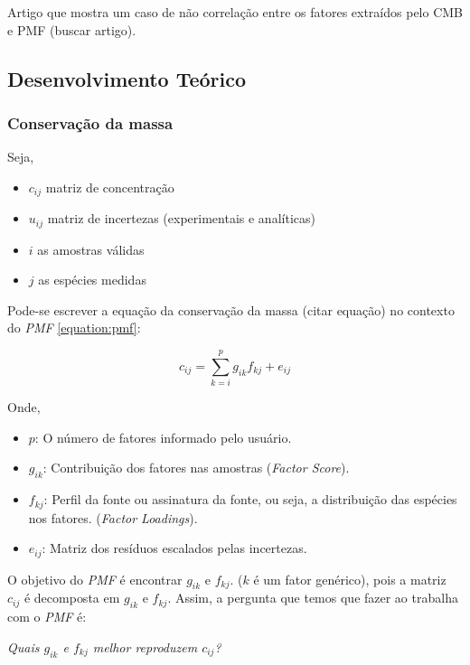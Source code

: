 Artigo que mostra um caso de não correlação entre os fatores extraídos pelo 
CMB e PMF (buscar artigo).

\subsection{Desenvolvimento Teórico} 

\subsubsection{Conservação da massa}

Seja,

\begin{itemize}
  \item $c_{ij}$ matriz de concentração
  \item $u_{ij}$ matriz de incertezas (experimentais e analíticas)
  \item $i$ as amostras válidas
  \item $j$ as espécies medidas
\end{itemize}

Pode-se escrever a equação da conservação da massa (citar equação) no 
contexto do \textit{PMF} \ref{equation:pmf}: 

\begin{equation}
  c_{ij} = \sum_{k=i}^p g_{ik}f_{kj} + e_{ij}
  \label{equation:pmf}
\end{equation}

Onde,

\begin{itemize}
  \item $p$: O número de fatores informado pelo usuário.
  \item $g_{ik}$: Contribuição dos fatores nas amostras (\textit{Factor Score}).
  \item $f_{kj}$: Perfil da fonte ou assinatura da fonte, ou seja, 
        a distribuição das espécies nos fatores. (\textit{Factor Loadings}).
  \item $e_{ij}$: Matriz dos resíduos escalados pelas incertezas.
\end{itemize}

O objetivo do \textit{PMF} é encontrar $g_{ik}$ e $f_{kj}$. 
($k$ é um fator genérico), pois a matriz $c_{ij}$ é decomposta em 
$g_{ik}$ e $f_{kj}$. Assim, a pergunta que temos que fazer ao trabalha com 
o \textit{PMF} é: 

\textit{Quais $g_{ik}$ e $f_{kj}$ melhor reproduzem $c_{ij}$?}

